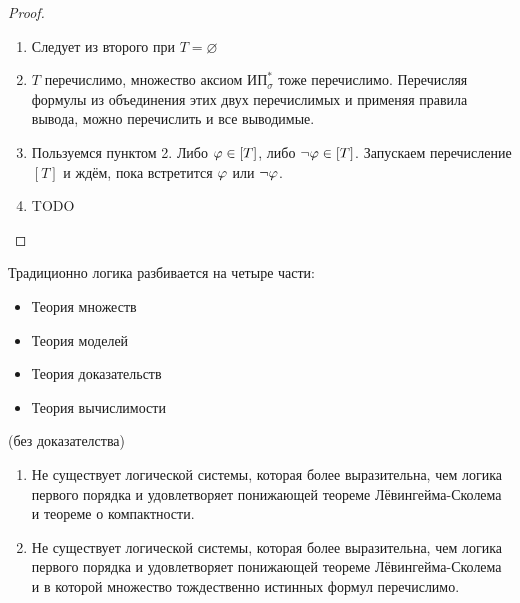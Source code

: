 \begin{proof}\
    \begin{enumerate}
        \item Следует из второго при $T=\varnothing$ 
        \item $T$ перечислимо, множество аксиом $\text{ИП}^*_\sigma$ тоже перечислимо. Перечисляя формулы из объединения этих двух перечислимых и применяя правила вывода, можно перечислить и все выводимые. %

%

        \item Пользуемся пунктом 2. Либо $\varphi\in[T]$, либо $\neg\varphi\in[T]$. Запускаем перечисление $[T]$ и ждём, пока встретится $\varphi$ или $\neg\varphi$.
        
        \item TODO %
    \end{enumerate}
\end{proof}


\begin{remark}
    Традиционно логика разбивается на четыре части:
    \begin{itemize}
        \item Теория множеств
        \item Теория моделей
        \item Теория доказательств
        \item Теория вычислимости
    \end{itemize}
\end{remark}

\begin{theorem}[Линдстрёма]
    (без доказателства)

    \begin{enumerate}
        \item Не существует логической системы, которая более выразительна, чем логика первого порядка и удовлетворяет понижающей теореме Лёвингейма-Сколема и теореме о компактности.
        \item Не существует логической системы, которая более выразительна, чем логика первого порядка и удовлетворяет понижающей теореме Лёвингейма-Сколема и в которой множество тождественно истинных формул перечислимо.
    \end{enumerate}
\end{theorem}


